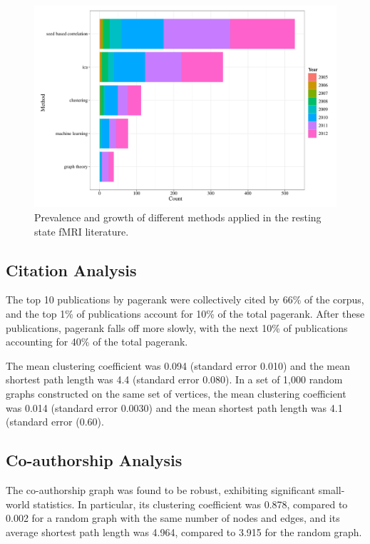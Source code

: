 \documentclass[5p]{elsarticle}
\begin{document}
\begin{figure}
  \begin{center}
    \includegraphics[width=\linewidth]{figures/methods_growth_hist}%
    \caption{Prevalence and growth of different methods applied in the resting
    state fMRI literature. 
        \label{fig:methods_growth_hist}
    }
  \end{center}
\end{figure}

\subsection{Citation Analysis} 
The top 10 publications by pagerank were collectively cited by 66\% of the
corpus, and the top 1\% of publications account for 10\% of the total
pagerank.  After these publications, pagerank falls off more slowly, with
the next 10\% of publications accounting for 40\% of the total pagerank. 

The mean clustering coefficient was 0.094 (standard error 0.010) and the
mean shortest path length was 4.4 (standard error 0.080). In a set of
1,000 random graphs constructed on the same set of vertices, the mean
clustering coefficient was 0.014 (standard error 0.0030) and the mean
shortest path length was 4.1 (standard error (0.60).

\subsection{Co-authorship Analysis} The co-authorship graph was found to
be robust, exhibiting significant small-world statistics. In particular,
its clustering coefficient was 0.878, compared to 0.002 for a random graph
with the same number of nodes and edges, and its average shortest path
length was 4.964, compared to 3.915 for the random graph.
\end{document}
